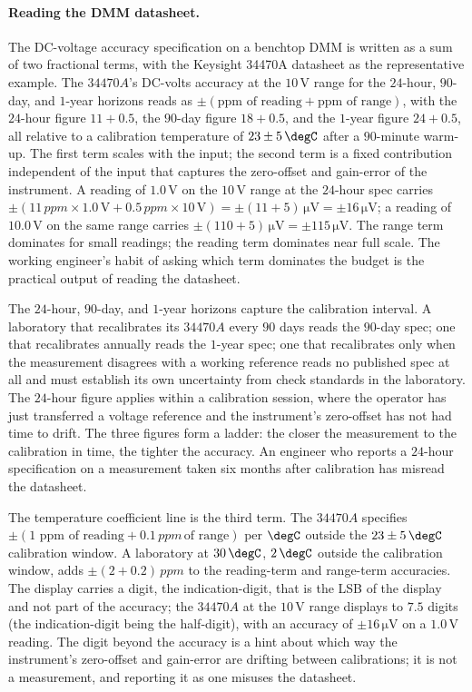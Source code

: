\paragraph{Reading the DMM datasheet.} The DC-voltage accuracy
specification on a benchtop DMM is written as a sum of two
fractional terms, with the Keysight 34470A datasheet
\cite{text:ch05t3b-keysight-34470a-datasheet} as the representative
example. The $34470A$'s DC-volts accuracy at the $10 \,\si{\volt}$
range for the $24$-hour, $90$-day, and $1$-year horizons reads as
$\pm (\text{ppm of reading} + \text{ppm of range})$, with the
$24$-hour figure $11 + 0.5$, the $90$-day figure $18 + 0.5$, and the
$1$-year figure $24 + 0.5$, all relative to a calibration temperature
of $23 \pm 5 \,\degC$ after a $90$-minute warm-up. The first term
scales with the input; the second term is a fixed contribution
independent of the input that captures the zero-offset and
gain-error of the instrument. A reading of $1.0 \,\si{\volt}$
on the $10 \,\si{\volt}$ range at the $24$-hour spec carries
$\pm (11 \,\si{ppm} \times 1.0 \,\si{\volt} + 0.5 \,\si{ppm} \times
10 \,\si{\volt}) = \pm (11 + 5) \,\si{\micro\volt} = \pm 16
\,\si{\micro\volt}$; a reading of $10.0 \,\si{\volt}$ on the same
range carries $\pm (110 + 5) \,\si{\micro\volt} = \pm 115 \,\si{
\micro\volt}$. The range term dominates for small readings; the
reading term dominates near full scale. The working engineer's habit
of asking which term dominates the budget is the practical output
of reading the datasheet.

The $24$-hour, $90$-day, and $1$-year horizons capture the
calibration interval. A laboratory that recalibrates its $34470A$
every $90$ days reads the $90$-day spec; one that recalibrates
annually reads the $1$-year spec; one that recalibrates only when
the measurement disagrees with a working reference reads no
published spec at all and must establish its own uncertainty from
check standards in the laboratory. The $24$-hour figure applies
within a calibration session, where the operator has just
transferred a voltage reference and the instrument's zero-offset
has not had time to drift. The three figures form a ladder: the
closer the measurement to the calibration in time, the tighter the
accuracy. An engineer who reports a $24$-hour specification on a
measurement taken six months after calibration has misread the
datasheet.

The temperature coefficient line is the third term. The
$34470A$ specifies $\pm (\text{1 ppm of reading} + 0.1 \,\si{ppm} \,
\text{of range})$ per $\degC$ outside the $23 \pm 5 \,\degC$
calibration window. A laboratory at $30 \,\degC$, $2 \,\degC$
outside the calibration window, adds
$\pm (2 + 0.2) \,\si{ppm}$ to the reading-term and range-term
accuracies. The display carries a digit, the indication-digit,
that is the LSB of the display and not part of the accuracy; the
$34470A$ at the $10 \,\si{\volt}$ range displays to $7.5$ digits
(the indication-digit being the half-digit), with an accuracy of
$\pm 16 \,\si{\micro\volt}$ on a $1.0 \,\si{\volt}$ reading. The
digit beyond the accuracy is a hint about which way the
instrument's zero-offset and gain-error are drifting between
calibrations; it is not a measurement, and reporting it as one
misuses the datasheet.

